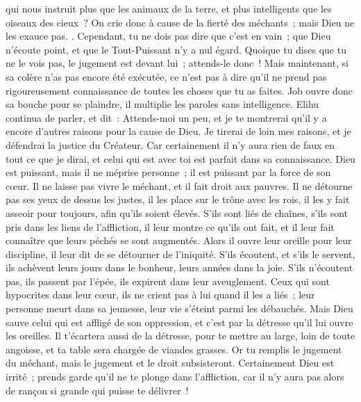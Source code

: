 \begin{multicols}{2}
qui nous instruit plus que les animaux de la terre, et plus intelligents que les oiseaux des cieux~?
On crie donc à cause de la fierté des méchants~; mais Dieu ne les exauce pas.
.
Cependant, tu ne dois pas dire que c'est en vain~; que Dieu n'écoute point, et que le Tout-Puissant n'y a nul égard.
Quoique tu dises que tu ne le vois pas, le jugement est devant lui~; attends-le donc~!
Mais maintenant, si sa colère n'as pas encore été exécutée, ce n'est pas à dire qu'il ne prend pas rigoureusement connaissance de toutes les choses que tu as faites.
Job ouvre donc sa bouche pour se plaindre, il multiplie les paroles sans intelligence.
\VerseOne{}Elihu continua de parler, et dit~:
Attends-moi un peu, et je te montrerai qu'il y a encore d'autres raisons pour la cause de Dieu.
Je tirerai de loin mes raisons, et je défendrai la justice du Créateur.
Car certainement il n'y aura rien de faux en tout ce que je dirai, et celui qui est avec toi est parfait dans sa connaissance.
Dieu est puissant, mais il ne méprise personne~; il est puissant par la force de son cœur.
Il ne laisse pas vivre le méchant, et il fait droit aux pauvres.
Il ne détourne pas ses yeux de dessus les justes, il les place sur le trône avec les rois, il les y fait asseoir pour toujours, afin qu'ils soient élevés.
S'ils sont liés de chaînes, s'ils sont pris dans les liens de l'affliction,
il leur montre ce qu'ils ont fait, et il leur fait connaître que leurs péchés se sont augmentés.
Alors il ouvre leur oreille pour leur discipline, il leur dit de se détourner de l'iniquité.
S'ils écoutent, et s'ils le servent, ils achèvent leurs jours dans le bonheur, leurs années dans la joie.
S'ils n'écoutent pas, ils passent par l'épée, ils expirent dans leur aveuglement.
Ceux qui sont hypocrites dans leur cœur, ils ne crient pas à lui quand il les a liés~;
leur personne meurt dans sa jeunesse, leur vie s'éteint parmi les débauchés.
Mais Dieu sauve celui qui est affligé de son oppression, et c'est par la détresse qu'il lui ouvre les oreilles.
Il t'écartera aussi de la détresse, pour te mettre au large, loin de toute angoisse, et ta table sera chargée de viandes grasses.
Or tu remplis le jugement du méchant, mais le jugement et le droit subsisteront.
Certainement Dieu est irrité~; prends garde qu'il ne te plonge dans l'affliction, car il n'y aura pas alors de rançon si grande qui puisse te délivrer~!

\end{multicols}
